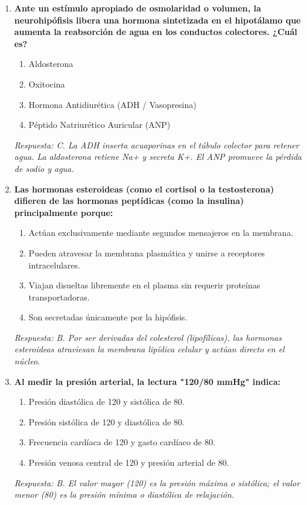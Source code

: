 \begin{enumerate}[label=\textbf{\arabic*.}]
    \item \textbf{Ante un estímulo apropiado de osmolaridad o volumen, la neurohipófisis libera una hormona sintetizada en el hipotálamo que aumenta la reabsorción de agua en los conductos colectores. ¿Cuál es?}
    \begin{enumerate}
        \item[A)] Aldosterona
        \item[B)] Oxitocina
        \item[C)] Hormona Antidiurética (ADH / Vasopresina)
        \item[D)] Péptido Natriurético Auricular (ANP)
    \end{enumerate}
    \textit{Respuesta: C. La ADH inserta acuaporinas en el túbulo colector para retener agua. La aldosterona retiene Na+ y secreta K+. El ANP promueve la pérdida de sodio y agua.}

    \item \textbf{Las hormonas esteroideas (como el cortisol o la testosterona) difieren de las hormonas peptídicas (como la insulina) principalmente porque:}
    \begin{enumerate}
        \item[A)] Actúan exclusivamente mediante segundos mensajeros en la membrana.
        \item[B)] Pueden atravesar la membrana plasmática y unirse a receptores intracelulares.
        \item[C)] Viajan disueltas libremente en el plasma sin requerir proteínas transportadoras.
        \item[D)] Son secretadas únicamente por la hipófisis.
    \end{enumerate}
    \textit{Respuesta: B. Por ser derivadas del colesterol (lipofílicas), las hormonas esteroideas atraviesan la membrana lipídica celular y actúan directo en el núcleo.}

    \item \textbf{Al medir la presión arterial, la lectura "120/80 mmHg" indica:}
    \begin{enumerate}
        \item[A)] Presión diastólica de 120 y sistólica de 80.
        \item[B)] Presión sistólica de 120 y diastólica de 80.
        \item[C)] Frecuencia cardíaca de 120 y gasto cardíaco de 80.
        \item[D)] Presión venosa central de 120 y presión arterial de 80.
    \end{enumerate}
    \textit{Respuesta: B. El valor mayor (120) es la presión máxima o sistólica; el valor menor (80) es la presión mínima o diastólica de relajación.}


\end{enumerate}
